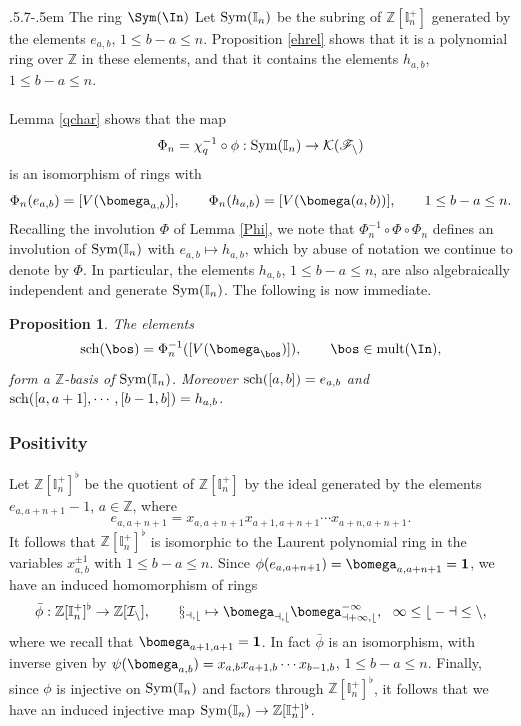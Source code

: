 \documentclass[11pt,reqno]{amsart}
\makeatletter
\newtheorem*{prop}{Proposition}
\theoremstyle{definition} \newtheorem*{defn}{Definition}
\theoremstyle{definition}
\numberwithin{equation}{section}
\def\subsection{\def\@secnumfont{\bfseries}\@startsection{subsection}{2}%
  {\parindent}{.5\linespacing\@plus.7\linespacing}{-.5em}%
  {\normalfont\bfseries}}
\def\mult{\operatorname{mult}}
\makeatother
\begin{document}
\subsection{The ring $\Sym(\In)$}\label{Phisym} Let ${\rm Sym}(\mathbb I_n)$ be the subring of $\mathbb Z[\mathbb I_n^+]$
generated by the elements $e_{a,b}$, $1\le b-a\le n$. Proposition \ref{ehrel} shows that it is a
polynomial ring over $\mathbb Z$ in these elements, and that it contains the
elements $h_{a,b}$, $1\le b-a\le n$. \\\\
Lemma \ref{qchar} shows that the map
$$\Phi_n=\chi_q^{-1}\circ\phi:{\rm Sym}(\mathbb I_n)\to\cal K(\mathscr F_n)$$
is an isomorphism of rings with
$$\Phi_n(e_{a,b})=[V(\bomega_{a,b})],\qquad \Phi_n(h_{a,b})=[V(\bomega(a,b))],\qquad 1\le b-a\le n.$$
Recalling the involution $\Phi$ of Lemma \ref{Phi}, we note that $\Phi_n^{-1}\circ\Phi\circ\Phi_n$ defines an
involution of ${\rm Sym}(\mathbb I_n)$ with $e_{a,b}\mapsto h_{a,b}$, which by abuse of
notation we continue to denote by $\Phi$. In particular, the elements $h_{a,b}$,
$1\le b-a\le n$, are also algebraically independent and generate ${\rm Sym}(\mathbb I_n)$. The following is now immediate.
\begin{prop} The elements
$${\rm sch}(\bos)=\Phi_n^{-1}([V(\bomega_{\bos})]),\qquad \bos\in\mult(\In),$$
form a $\mathbb Z$-basis of ${\rm Sym}(\mathbb I_n)$. Moreover ${\rm sch}([a,b])=e_{a,b}$ and
${\rm sch}([a,a+1],\cdots,[b-1,b])=h_{a,b}$.\hfill\qedsymbol
\end{prop}

\subsubsection{Positivity} Let $\mathbb Z[\mathbb I_n^+]^\flat$ be the quotient of
$\mathbb Z[\mathbb I_n^+]$ by the ideal generated by the elements $e_{a,a+n+1}-1$, $a\in\mathbb Z$, where
$$e_{a,a+n+1}=x_{a,a+n+1}x_{a+1,a+n+1}\cdots x_{a+n,a+n+1}.$$ It
follows that $\mathbb Z[\mathbb I_n^+]^\flat$ is isomorphic to the Laurent polynomial ring in the
variables $x_{a,b}^{\pm1}$ with $1\le b-a\le n$. Since $\phi(e_{a,a+n+1})=\bomega_{a,a+n+1}=\bold 1$, we have an induced
homomorphism of rings
$$\bar\phi:\mathbb Z[\mathbb I_n^+]^\flat\to\mathbb Z[\cal I_n],\qquad
x_{a,b}\mapsto\bomega_{a,b}\bomega_{a+1,b}^{-1},\ \ 1\le b-a\le n,$$
where we recall that $\bomega_{a+1,a+1}=\bold 1$. In fact $\bar\phi$ is an isomorphism, with inverse given by
$\psi(\bomega_{a,b})=x_{a,b}x_{a+1,b}\cdots x_{b-1,b}$, $1\le b-a\le n$.
Finally, since $\phi$ is injective on ${\rm Sym}(\mathbb I_n)$ and factors through
$\mathbb Z[\mathbb I_n^+]^\flat$, it follows that we have an induced injective map ${\rm Sym}(\mathbb I_n)\to\mathbb Z[\mathbb I_n^+]^\flat$.
\end{document}
